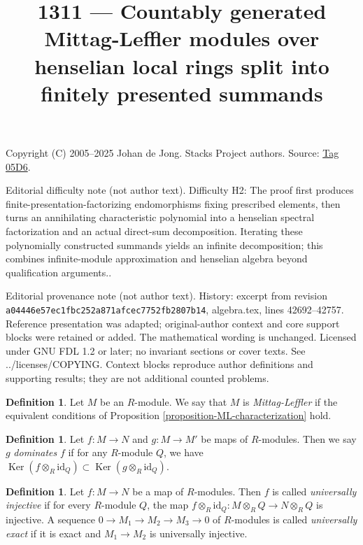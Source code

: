 \documentclass{amsart}
\theoremstyle{plain}
\theoremstyle{definition}
\newtheorem{definition}[subsection]{Definition}
\theoremstyle{remark}
\numberwithin{equation}{subsection}
\def\Ker{\mathop{\mathrm{Ker}}}
\begin{document}
\title[Stacks Project, Tag 05D6]{1311 --- Countably generated Mittag-Leffler modules over henselian local rings split into finitely presented summands}
\maketitle
\noindent Copyright (C) 2005--2025 Johan de Jong. Stacks Project authors. Source: \href{https://stacks.math.columbia.edu/tag/05D6}{Tag 05D6}.

\noindent Editorial difficulty note (not author text). Difficulty H2: The proof first produces finite-presentation-factorizing endomorphisms fixing prescribed elements, then turns an annihilating characteristic polynomial into a henselian spectral factorization and an actual direct-sum decomposition. Iterating these polynomially constructed summands yields an infinite decomposition; this combines infinite-module approximation and henselian algebra beyond qualification arguments..

\noindent Editorial provenance note (not author text). History: excerpt from revision \texttt{a0444\allowbreak 6e57e\allowbreak c1fbc\allowbreak 252a8\allowbreak 71afc\allowbreak ec775\allowbreak 2fb28\allowbreak 07b14}, algebra.tex, lines 42692--42757. Reference presentation was adapted; original-author context and core support blocks were retained or added. The mathematical wording is unchanged. Licensed under GNU FDL 1.2 or later; no invariant sections or cover texts. See ../licenses/COPYING. Context blocks reproduce author definitions and supporting results; they are not additional counted problems.

\begin{definition}
\label{definition-mittag-leffler-module}
Let $M$ be an $R$-module.  We say that $M$ is {\it Mittag-Leffler} if the
equivalent conditions of
Proposition \ref{proposition-ML-characterization}
hold.
\end{definition}

\begin{definition}
\label{definition-domination}
Let $f: M \to N$ and $g: M \to M'$ be maps of $R$-modules.
Then we say $g$ {\it dominates} $f$ if for any $R$-module $Q$, we have $\Ker(f
\otimes_R \text{id}_Q) \subset \Ker(g \otimes_R \text{id}_Q)$.
\end{definition}

\begin{definition}
\label{definition-universally-injective}
Let $f: M \to N$ be a map of $R$-modules.  Then $f$ is called
{\it universally injective} if for every $R$-module $Q$, the map $f
\otimes_R \text{id}_Q: M \otimes_R Q \to N \otimes_R Q$
is injective.  A sequence $0 \to M_1 \to M_2 \to M_3
\to 0$ of $R$-modules is called {\it universally exact} if it is exact
and $M_1 \to M_2$ is universally injective.
\end{definition}
\end{document}
